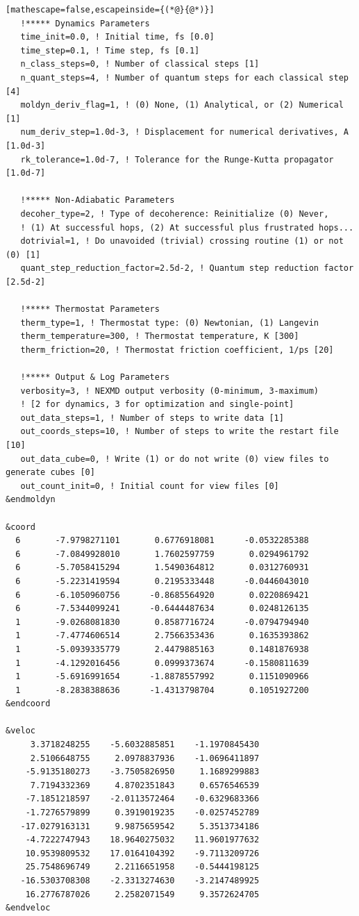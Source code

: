 \documentclass[letterpaper,12pt,titlepage]{article}
\begin{document}
\begin{appendix}
\begin{lstlisting}[mathescape=false,escapeinside={(*@}{@*)}]
   !***** Dynamics Parameters
   time_init=0.0, ! Initial time, fs [0.0]
   time_step=0.1, ! Time step, fs [0.1]
   n_class_steps=0, ! Number of classical steps [1]
   n_quant_steps=4, ! Number of quantum steps for each classical step [4]
   moldyn_deriv_flag=1, ! (0) None, (1) Analytical, or (2) Numerical [1]
   num_deriv_step=1.0d-3, ! Displacement for numerical derivatives, A [1.0d-3]
   rk_tolerance=1.0d-7, ! Tolerance for the Runge-Kutta propagator [1.0d-7]

   !***** Non-Adiabatic Parameters
   decoher_type=2, ! Type of decoherence: Reinitialize (0) Never, 
   ! (1) At successful hops, (2) At successful plus frustrated hops... 
   dotrivial=1, ! Do unavoided (trivial) crossing routine (1) or not (0) [1]
   quant_step_reduction_factor=2.5d-2, ! Quantum step reduction factor [2.5d-2]

   !***** Thermostat Parameters
   therm_type=1, ! Thermostat type: (0) Newtonian, (1) Langevin
   therm_temperature=300, ! Thermostat temperature, K [300]
   therm_friction=20, ! Thermostat friction coefficient, 1/ps [20]

   !***** Output & Log Parameters
   verbosity=3, ! NEXMD output verbosity (0-minimum, 3-maximum)
   ! [2 for dynamics, 3 for optimization and single-point]
   out_data_steps=1, ! Number of steps to write data [1]
   out_coords_steps=10, ! Number of steps to write the restart file [10]
   out_data_cube=0, ! Write (1) or do not write (0) view files to generate cubes [0]
   out_count_init=0, ! Initial count for view files [0]
&endmoldyn

&coord
  6       -7.9798271101       0.6776918081      -0.0532285388
  6       -7.0849928010       1.7602597759       0.0294961792
  6       -5.7058415294       1.5490364812       0.0312760931
  6       -5.2231419594       0.2195333448      -0.0446043010
  6       -6.1050960756      -0.8685564920       0.0220869421
  6       -7.5344099241      -0.6444487634       0.0248126135
  1       -9.0268081830       0.8587716724      -0.0794794940
  1       -7.4774606514       2.7566353436       0.1635393862
  1       -5.0939335779       2.4479885163       0.1481876938
  1       -4.1292016456       0.0999373674      -0.1580811639
  1       -5.6916991654      -1.8878557992       0.1151090966
  1       -8.2838388636      -1.4313798704       0.1051927200
&endcoord

&veloc
     3.3718248255    -5.6032885851    -1.1970845430
     2.5106648755     2.0978837936    -1.0696411897
    -5.9135180273    -3.7505826950     1.1689299883
     7.7194332369     4.8702351843     0.6576546539
    -7.1851218597    -2.0113572464    -0.6329683366
    -1.7276579899     0.3919019235    -0.0257452789
   -17.0279163131     9.9875659542     5.3513734186
    -4.7222747943    18.9640275032    11.9601977632
    10.9539809532    17.0164104392    -9.7113209726
    25.7548696749     2.2116651958    -0.5444198125
   -16.5303708308    -2.3313274630    -3.2147489925
    16.2776787026     2.2582071549     9.3572624705
&endveloc


\end{lstlisting}
\end{appendix}
\end{document}
